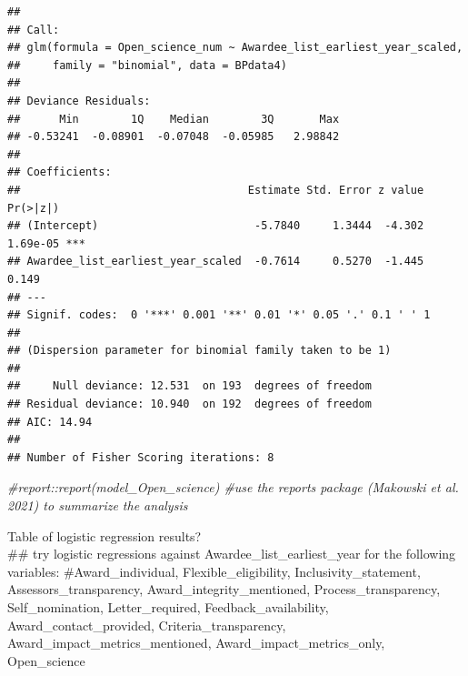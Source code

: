 \documentclass[
]{article}
\newenvironment{Shaded}{\begin{snugshade}}{\end{snugshade}}
\newcommand{\CommentTok}[1]{\textcolor[rgb]{0.56,0.35,0.01}{\textit{#1}}}
\newcommand{\FunctionTok}[1]{\textcolor[rgb]{0.00,0.00,0.00}{#1}}
\newcommand{\NormalTok}[1]{#1}
\newcommand{\OtherTok}[1]{\textcolor[rgb]{0.56,0.35,0.01}{#1}}
\newcommand{\SpecialCharTok}[1]{\textcolor[rgb]{0.00,0.00,0.00}{#1}}
\begin{document}
\begin{verbatim}
## 
## Call:
## glm(formula = Open_science_num ~ Awardee_list_earliest_year_scaled, 
##     family = "binomial", data = BPdata4)
## 
## Deviance Residuals: 
##      Min        1Q    Median        3Q       Max  
## -0.53241  -0.08901  -0.07048  -0.05985   2.98842  
## 
## Coefficients:
##                                   Estimate Std. Error z value Pr(>|z|)    
## (Intercept)                        -5.7840     1.3444  -4.302 1.69e-05 ***
## Awardee_list_earliest_year_scaled  -0.7614     0.5270  -1.445    0.149    
## ---
## Signif. codes:  0 '***' 0.001 '**' 0.01 '*' 0.05 '.' 0.1 ' ' 1
## 
## (Dispersion parameter for binomial family taken to be 1)
## 
##     Null deviance: 12.531  on 193  degrees of freedom
## Residual deviance: 10.940  on 192  degrees of freedom
## AIC: 14.94
## 
## Number of Fisher Scoring iterations: 8
\end{verbatim}

\begin{Shaded}
\begin{Highlighting}[]
\CommentTok{\#report::report(model\_Open\_science) \#use the reports package (Makowski et al. 2021) to summarize the analysis}
\end{Highlighting}
\end{Shaded}

Table of logistic regression results?\\
\#\# try logistic regressions against Awardee\_list\_earliest\_year for
the following variables: \#Award\_individual, Flexible\_eligibility,
Inclusivity\_statement, Assessors\_transparency,
Award\_integrity\_mentioned, Process\_transparency, Self\_nomination,
Letter\_required, Feedback\_availability, Award\_contact\_provided,
Criteria\_transparency, Award\_impact\_metrics\_mentioned,
Award\_impact\_metrics\_only, Open\_science

\begin{Shaded}
\end{Shaded}
\end{document}
